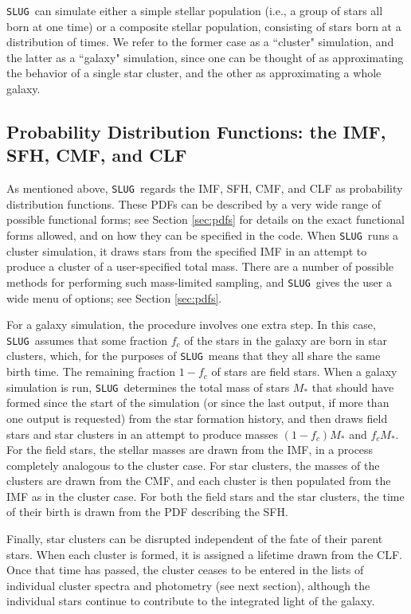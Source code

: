 \documentclass[12pt]{article}
\newcommand{\slug}{\texttt{SLUG}}
\begin{document}
\slug\ can simulate either a simple stellar population (i.e., a group of stars all born at one time) or a composite stellar population, consisting of stars born at a distribution of times. We refer to the former case as a ``cluster" simulation, and the latter as a ``galaxy" simulation, since one can be thought of as approximating the behavior of a single star cluster, and the other as approximating a whole galaxy.

\subsection{Probability Distribution Functions: the IMF, SFH, CMF, and CLF}

As mentioned above, \slug\ regards the IMF, SFH, CMF, and CLF as probability distribution functions. These PDFs can be described by a very wide range of possible functional forms; see Section \ref{sec:pdfs} for details on the exact functional forms allowed, and on how they can be specified in the code. When \slug\ runs a cluster simulation, it draws stars from the specified IMF in an attempt to produce a cluster of a user-specified total mass. There are a number of possible methods for performing such mass-limited sampling, and \slug\ gives the user a wide menu of options; see Section \ref{sec:pdfs}. 

For a galaxy simulation, the procedure involves one extra step. In this case, \slug\ assumes that some fraction $f_c$ of the stars in the galaxy are born in star clusters, which, for the purposes of \slug\, means that they all share the same birth time. The remaining fraction $1-f_c$ of stars are field stars. When a galaxy simulation is run, \slug\ determines the total mass of stars $M_*$ that should have formed since the start of the simulation (or since the last output, if more than one output is requested) from the star formation history, and then draws field stars and star clusters in an attempt to produce masses $(1-f_c)M_*$ and $f_c M_*$. For the field stars, the stellar masses are drawn from the IMF, in a process completely analogous to the cluster case. For star clusters, the masses of the clusters are drawn from the CMF, and each cluster is then populated from the IMF as in the cluster case. For both the field stars and the star clusters, the time of their birth is drawn from the PDF describing the SFH.

Finally, star clusters can be disrupted independent of the fate of their parent stars. When each cluster is formed, it is assigned a lifetime drawn from the CLF. Once that time has passed, the cluster ceases to be entered in the lists of individual cluster spectra and photometry (see next section), although the individual stars continue to contribute to the integrated light of the galaxy.
\end{document}
